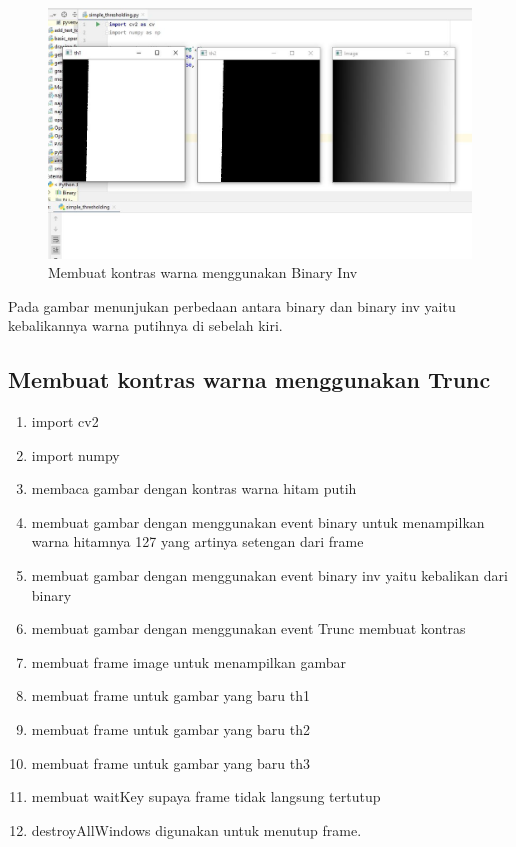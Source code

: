 \newpage
\begin{figure}[ht]
\centering
\includegraphics[scale=0.5]{figures/2,39.jpg}
\caption{Membuat kontras warna menggunakan Binary Inv}
\label{contoh}
\end{figure}
Pada gambar menunjukan perbedaan antara binary dan binary inv yaitu kebalikannya warna putihnya di sebelah kiri.




\newpage
\subsection{Membuat kontras warna menggunakan Trunc}

\begin{enumerate}
	\item import cv2
	\item import numpy
	\item membaca gambar dengan kontras warna hitam putih
	\item membuat gambar dengan menggunakan event binary untuk menampilkan warna hitamnya 127 yang artinya setengan dari frame
	\item membuat gambar dengan menggunakan event binary inv yaitu kebalikan dari binary
	\item membuat gambar dengan menggunakan event Trunc membuat kontras 
	\item membuat frame image untuk menampilkan gambar
	\item membuat frame untuk gambar yang baru th1
	\item membuat frame untuk gambar yang baru th2
	\item membuat frame untuk gambar yang baru th3
	\item membuat waitKey supaya frame tidak langsung tertutup
	\item destroyAllWindows digunakan untuk menutup frame.
\end{enumerate}


